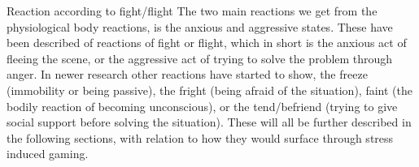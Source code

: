 Reaction according to fight/flight
The two main reactions we get from the physiological body reactions, is the anxious and aggressive states. These have been described of reactions of fight or flight, which in short is the anxious act of fleeing the scene, or the aggressive act of trying to solve the problem through anger. In newer research other reactions have started to show, the freeze (immobility or being passive), the fright (being afraid of the situation), faint (the bodily reaction of becoming unconscious), or the tend/befriend (trying to give social support before solving the situation).
These will all be further described in the following sections, with relation to how they would surface through stress induced gaming. %